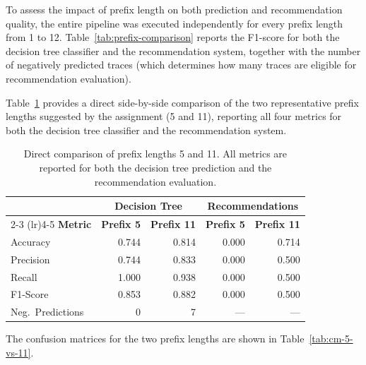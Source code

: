 \documentclass{article}
\begin{document}
To assess the impact of prefix length on both prediction and recommendation quality, the entire pipeline was executed independently for every prefix length from 1 to 12. Table~\ref{tab:prefix-comparison} reports the F1-score for both the decision tree classifier and the recommendation system, together with the number of negatively predicted traces (which determines how many traces are eligible for recommendation evaluation).

Table~\ref{tab:prefix-5-vs-11} provides a direct side-by-side comparison of the two representative prefix lengths suggested by the assignment (5 and 11), reporting all four metrics for both the decision tree classifier and the recommendation system.

\begin{table}[H]
\centering
\caption{Direct comparison of prefix lengths 5 and 11. All metrics are reported for both the decision tree prediction and the recommendation evaluation.}
\label{tab:prefix-5-vs-11}
\begin{tabular}{l rr rr}
\toprule
& \multicolumn{2}{c}{\textbf{Decision Tree}} & \multicolumn{2}{c}{\textbf{Recommendations}} \\
\cmidrule(lr){2-3} \cmidrule(lr){4-5}
\textbf{Metric} & \textbf{Prefix 5} & \textbf{Prefix 11} & \textbf{Prefix 5} & \textbf{Prefix 11} \\
\midrule
Accuracy  & 0.744 & 0.814 & 0.000 & 0.714 \\
Precision & 0.744 & 0.833 & 0.000 & 0.500 \\
Recall    & 1.000 & 0.938 & 0.000 & 0.500 \\
F1-Score  & 0.853 & 0.882 & 0.000 & 0.500 \\
\midrule
Neg.\ Predictions & 0 & 7 & --- & --- \\
\bottomrule
\end{tabular}
\end{table}

\noindent
The confusion matrices for the two prefix lengths are shown in Table~\ref{tab:cm-5-vs-11}.
\end{document}

